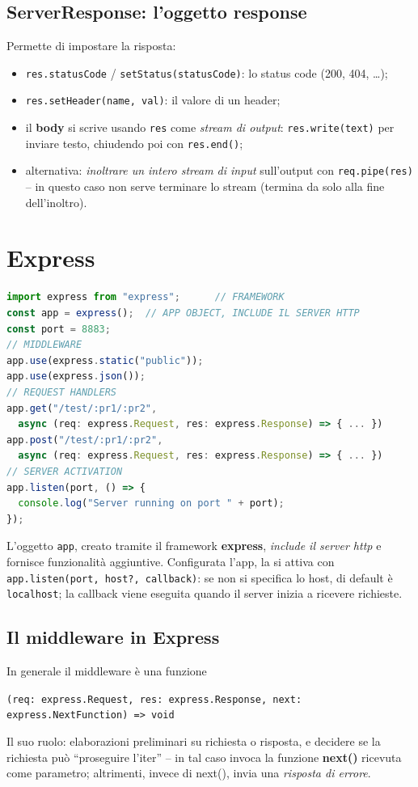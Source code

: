 \subsection{ServerResponse: l'oggetto response}
Permette di impostare la risposta:
\begin{itemize}
  \item \texttt{res.statusCode} / \texttt{setStatus(statusCode)}: lo status code (200, 404,
        \dots);
  \item \texttt{res.setHeader(name, val)}: il valore di un header;
  \item il \textbf{body} si scrive usando \texttt{res} come \emph{stream di output}:
        \texttt{res.write(text)} per inviare testo, chiudendo poi con \texttt{res.end()};
  \item alternativa: \emph{inoltrare un intero stream di input} sull'output con
        \texttt{req.pipe(res)} -- in questo caso non serve terminare lo stream (termina da
        solo alla fine dell'inoltro).
\end{itemize}

\section{Express}

\begin{lstlisting}[language=JavaScript]
import express from "express";      // FRAMEWORK
const app = express();  // APP OBJECT, INCLUDE IL SERVER HTTP
const port = 8883;
// MIDDLEWARE
app.use(express.static("public"));
app.use(express.json());
// REQUEST HANDLERS
app.get("/test/:pr1/:pr2",
  async (req: express.Request, res: express.Response) => { ... })
app.post("/test/:pr1/:pr2",
  async (req: express.Request, res: express.Response) => { ... })
// SERVER ACTIVATION
app.listen(port, () => {
  console.log("Server running on port " + port);
});
\end{lstlisting}

L'oggetto \texttt{app}, creato tramite il framework \textbf{express}, \emph{include il
server http} e fornisce funzionalit\`a aggiuntive. Configurata l'app, la si attiva con
\texttt{app.listen(port, host?, callback)}: se non si specifica lo host, di default \`e
\texttt{localhost}; la callback viene eseguita quando il server inizia a ricevere richieste.

\subsection{Il middleware in Express}
In generale il middleware \`e una funzione
\begin{center}
\texttt{(req: express.Request, res: express.Response, next: express.NextFunction) => void}
\end{center}
Il suo ruolo: elaborazioni preliminari su richiesta o risposta, e decidere se la richiesta
pu\`o ``proseguire l'iter'' -- in tal caso invoca la funzione \textbf{next()} ricevuta come
parametro; altrimenti, invece di next(), invia una \emph{risposta di errore}.


